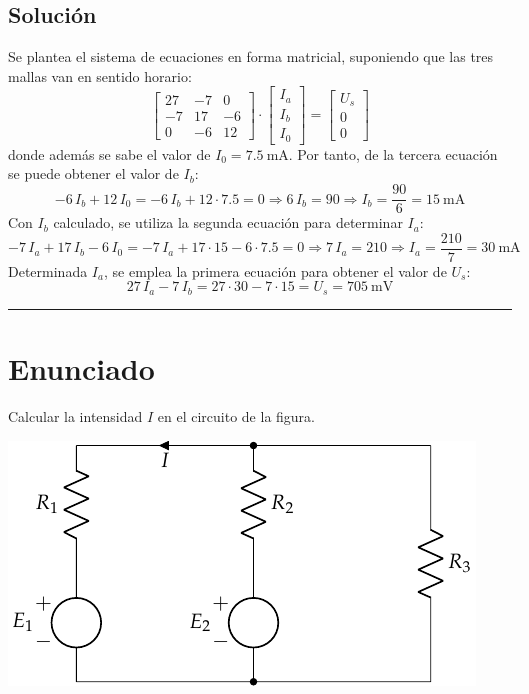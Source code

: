 \subsection*{Solución}
Se plantea el sistema de ecuaciones en forma matricial, suponiendo que
las tres mallas van en sentido horario:
\begin{equation*}
  \begin{bmatrix}
    27 & -7 & 0 \\
    -7 & 17 & -6 \\
    0 & -6 & 12
  \end{bmatrix} \cdot
  \begin{bmatrix}
    I_a\\
    I_b\\
    I_0
  \end{bmatrix} = %
  \begin{bmatrix}
    U_s \\
    0\\
    0
  \end{bmatrix}
\end{equation*}
donde además se sabe el valor de $I_0=\qty{7.5}{\milli\ampere}$. Por
tanto, de la tercera ecuación se puede obtener el valor de $I_b$:
\begin{equation*}
  -6\,I_b+12\,I_0=-6\,I_b+12\cdot 7.5 = 0\Rightarrow 6\,I_b=90 \Rightarrow I_b=\dfrac{90}{6}=\qty{15}{\milli\ampere}
\end{equation*}
Con $I_b$ calculado, se utiliza la segunda ecuación para determinar
$I_a$:
\begin{equation*}
  -7\,I_a+17\,I_b-6\,I_0=-7\,I_a+17\cdot 15-6\cdot 7.5 = 0\Rightarrow 7\,I_a=210\Rightarrow I_a=\dfrac{210}{7}=\qty{30}{\milli\ampere}
\end{equation*}
Determinada $I_a$, se emplea la primera ecuación para obtener el valor
de $U_s$:
\begin{equation*}
  27\,I_a-7\,I_b=27\cdot 30 - 7 \cdot 15 = U_s = {\qty{705}{\milli\volt}}
\end{equation*}

\noindent\rule{7in}{2.8pt}


\section{Enunciado}
Calcular la intensidad $I$ en el circuito de la figura.

\begin{center}
  \includegraphics{figuras/BT1_04.pdf}
\end{center}


